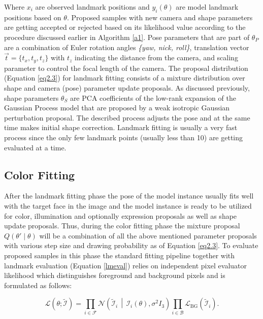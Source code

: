 Where $x_i$ are observed landmark positions and $y_i(\theta)$ are model landmark positions based on $\theta$. Proposed samples with new camera and shape parameters are getting accepted or rejected based on its likelihood value according to the procedure discussed earlier in Algorithm \ref{a1}. Pose parameters that are part of $\theta_P$ are a combination of Euler rotation angles \textit{\{yaw, nick, roll\}}, translation vector $\vec{t} = \{t_x, t_y, t_z\}$ with $t_z$ indicating the distance from the camera, and scaling parameter to control the focal length of the camera. The proposal distribution (Equation 
\ref{eq2.3}) for landmark fitting consists of a mixture distribution over shape and camera (pose) parameter update proposals. As discussed previously, shape parameters $\theta_S$ are PCA coefficients of the low-rank expansion of the Gaussian Process\cite{8010438} model that are proposed by a weak isotropic Gaussian perturbation proposal\cite{Schoenborn2017}.  The described process adjusts the pose and at the same time makes initial shape correction. Landmark fitting is usually a very fast process since the only few landmark points (usually less than 10) are getting evaluated at a time.

\subsection{Color Fitting}

After the landmark fitting phase the pose of the model instance usually fits well with the target face in the image and the model instance is ready to be utilized for color, illumination and optionally expression proposals as well as shape update proposals. Thus, during the color fitting phase the mixture proposal $Q(\theta'\mid\theta)$ will be a combination of all the above mentioned parameter proposals with various step size and drawing probability as of Equation \ref{eq2.3}. To evaluate proposed samples in this phase the standard fitting pipeline together with landmark evaluation (Equation \ref{lmeval}) relies on independent pixel evaluator likelihood which distinguishes foreground and background pixels\cite{Schonborn:2015:BMG:2798342.2798359} and is formulated as follows:

\begin{equation}
    \mathcal L \left (\theta; \tilde{\mathcal I} \right )
= \prod_{i \in \mathcal F} \mathcal N \left( \tilde{\mathcal I}_i \,\middle |\, \mathcal I_i(\theta), \sigma^2 I_3 \right ) \prod_{i \in \mathcal B} \mathcal L_{\text{BG}}\left ( \tilde{\mathcal I}_i \right ).
\label{eq2.7}
\end{equation}

